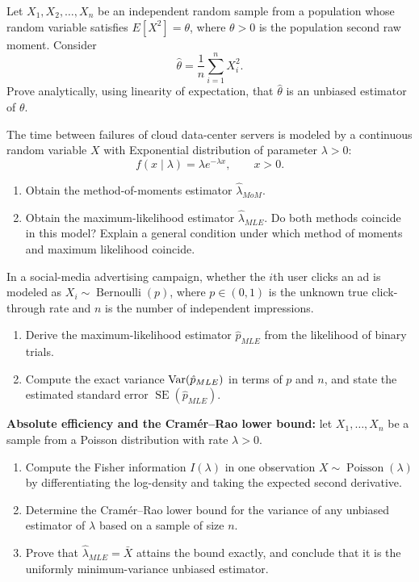 \begin{problema}\label{prob:1d85679}
Let $X_1,X_2,\ldots,X_n$ be an independent random sample from a population whose random variable satisfies $E[X^2]=\theta$, where $\theta>0$ is the population second raw moment. Consider
\[
	\hat\theta=\frac1n\sum_{i=1}^n X_i^2.
\]
Prove analytically, using linearity of expectation, that $\hat\theta$ is an unbiased estimator of $\theta$.
\end{problema}

\begin{problema}\label{prob:6f639cf}
The time between failures of cloud data-center servers is modeled by a continuous random variable $X$ with Exponential distribution of parameter $\lambda>0$:
\[
	f(x\mid\lambda)=\lambda e^{-\lambda x},\qquad x>0.
\]
\begin{enumerate}[label=(\alph*)]
	\item Obtain the method-of-moments estimator $\hat\lambda_{MoM}$.
	\item Obtain the maximum-likelihood estimator $\hat\lambda_{MLE}$. Do both methods coincide in this model? Explain a general condition under which method of moments and maximum likelihood coincide.
\end{enumerate}
\end{problema}

\begin{problema}\label{prob:0363afd}
In a social-media advertising campaign, whether the $i$th user clicks an ad is modeled as $X_i\sim\operatorname{Bernoulli}(p)$, where $p\in(0,1)$ is the unknown true click-through rate and $n$ is the number of independent impressions.
\begin{enumerate}[label=(\alph*)]
	\item Derive the maximum-likelihood estimator $\hat p_{MLE}$ from the likelihood of binary trials.
	\item Compute the exact variance $\operatorname{Var}(\hat p_{MLE})$ in terms of $p$ and $n$, and state the estimated standard error $\operatorname{SE}(\hat p_{MLE})$.
\end{enumerate}
\end{problema}

\begin{problema}\label{prob:977b8dd}
\textbf{Absolute efficiency and the Cramér--Rao lower bound:} let $X_1,\ldots,X_n$ be a sample from a Poisson distribution with rate $\lambda>0$.
\begin{enumerate}[label=(\alph*)]
	\item Compute the Fisher information $I(\lambda)$ in one observation $X\sim\operatorname{Poisson}(\lambda)$ by differentiating the log-density and taking the expected second derivative.
	\item Determine the Cramér--Rao lower bound for the variance of any unbiased estimator of $\lambda$ based on a sample of size $n$.
	\item Prove that $\hat\lambda_{MLE}=\bar X$ attains the bound exactly, and conclude that it is the uniformly minimum-variance unbiased estimator.
\end{enumerate}
\end{problema}

